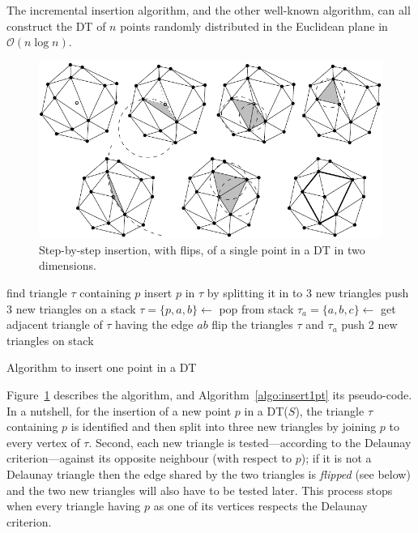 The incremental insertion algorithm, and the other well-known algorithm, can all construct the DT of $n$ points randomly distributed in the Euclidean plane in $\mathcal{O}(n \log n)$.


\begin{figure}
  \centering
  \includegraphics[width=1.0\textwidth]{figs/insertion_steps}
  \caption{Step-by-step insertion, with flips, of a single point in a DT in two dimensions.}
\label{fig:insertion_steps}
\end{figure}
\begin{algorithm}[tb] 
  \DontPrintSemicolon
  find triangle $\tau$ containing $p$\;
  insert $p$ in $\tau$ by splitting it in to 3 new triangles\;
  push 3 new triangles on a stack\;
  {
    $\tau = \{p,a,b\} \leftarrow$ pop from stack\;
    $\tau_{a} = \{a,b,c\} \leftarrow$ get adjacent triangle of $\tau$ having the edge $ab$\;
    {
      flip the triangles $\tau$ and $\tau_{a}$\;
      push 2 new triangles on stack\;
    }
  }
  \caption{Algorithm to insert one point in a DT}
\label{algo:insert1pt}
\end{algorithm} 

Figure~\ref{fig:insertion_steps} describes the algorithm, and Algorithm~\ref{algo:insert1pt} its pseudo-code. 
In a nutshell, for the insertion of a new point $p$ in a DT($S$), the triangle $\tau$ containing $p$ is identified and then split into three new triangles by joining $p$ to every vertex of $\tau$. 
Second, each new triangle is tested---according to the Delaunay criterion---against its opposite neighbour (with respect to $p$); if it is not a Delaunay triangle then the edge shared by the two triangles is \emph{flipped} (see below) and the two new triangles will also have to be tested later. 
This process stops when every triangle having $p$ as one of its vertices respects the Delaunay criterion.


